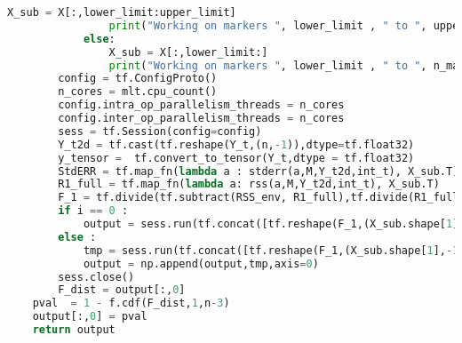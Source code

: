 \begin{lstlisting}[language=Python]
                X_sub = X[:,lower_limit:upper_limit]
                print("Working on markers ", lower_limit , " to ", upper_limit, " of ", n_marker )    
            else:
                X_sub = X[:,lower_limit:]
                print("Working on markers ", lower_limit , " to ", n_marker, " of ", n_marker )    
        config = tf.ConfigProto()
        n_cores = mlt.cpu_count()
        config.intra_op_parallelism_threads = n_cores
        config.inter_op_parallelism_threads = n_cores
        sess = tf.Session(config=config)                                             
        Y_t2d = tf.cast(tf.reshape(Y_t,(n,-1)),dtype=tf.float32)                     
        y_tensor =  tf.convert_to_tensor(Y_t,dtype = tf.float32)                                      
        StdERR = tf.map_fn(lambda a : stderr(a,M,Y_t2d,int_t), X_sub.T)              
        R1_full = tf.map_fn(lambda a: rss(a,M,Y_t2d,int_t), X_sub.T)
        F_1 = tf.divide(tf.subtract(RSS_env, R1_full),tf.divide(R1_full,(n-3)))
        if i == 0 :
            output = sess.run(tf.concat([tf.reshape(F_1,(X_sub.shape[1],-1)),StdERR],axis=1))
        else :
            tmp = sess.run(tf.concat([tf.reshape(F_1,(X_sub.shape[1],-1)),StdERR],axis=1))
            output = np.append(output,tmp,axis=0)
        sess.close()
        F_dist = output[:,0]
    pval  = 1 - f.cdf(F_dist,1,n-3)
    output[:,0] = pval
    return output 


  \end{lstlisting}

